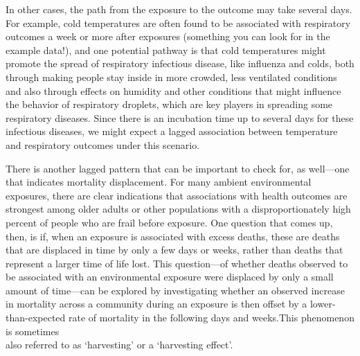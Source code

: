 \documentclass[
]{book}
\begin{document}
In other cases, the path from the exposure to the outcome may take several days.
For example, cold temperatures are often found to be associated with respiratory
outcomes a week or more after exposures (something you can look for in the
example data!), and one potential pathway is that cold temperatures might
promote the spread of respiratory infectious disease, like influenza and colds,
both through making people stay inside in more crowded, less ventilated
conditions and also through effects on humidity and other conditions that might
influence the behavior of respiratory droplets, which are key players in
spreading some respiratory diseases. Since there is an incubation time up to
several days for these infectious diseases, we might expect a lagged association
between temperature and respiratory outcomes under this scenario.

There is another lagged pattern that can be important to check for, as well---one
that indicates mortality displacement. For many ambient environmental exposures,
there are clear indications that associations with health outcomes are strongest
among older adults or other populations with a disproportionately high percent
of people who are frail before exposure. One question that comes up, then, is
if, when an exposure is associated with excess deaths, these are deaths that are
displaced in time by only a few days or weeks, rather than deaths that represent
a larger time of life lost. This question---of whether deaths observed to be
associated with an environmental exposure were displaced by only a small amount of
time---can be explored by investigating whether an observed increase in mortality
across a community during an exposure is then offset by a lower-than-expected
rate of mortality in the following days and weeks.This phenomenon is sometimes\\
also referred to as `harvesting' or a `harvesting effect'.
\end{document}

